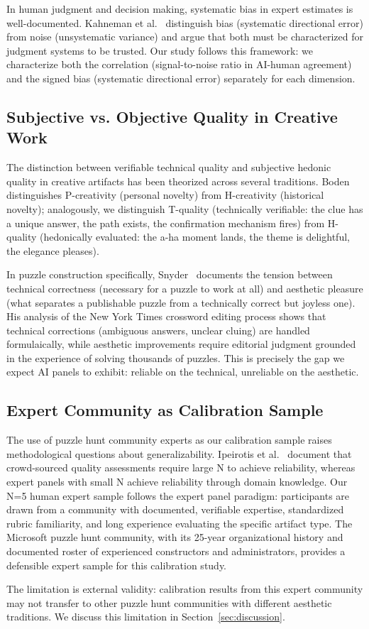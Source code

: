 In human judgment and decision making, systematic bias in expert estimates is well-documented. Kahneman et al.~\cite{kahneman2021noise} distinguish bias (systematic directional error) from noise (unsystematic variance) and argue that both must be characterized for judgment systems to be trusted. Our study follows this framework: we characterize both the correlation (signal-to-noise ratio in AI-human agreement) and the signed bias (systematic directional error) separately for each dimension.

\subsection{Subjective vs. Objective Quality in Creative Work}

The distinction between verifiable technical quality and subjective hedonic quality in creative artifacts has been theorized across several traditions. Boden~\cite{boden2004creative} distinguishes P-creativity (personal novelty) from H-creativity (historical novelty); analogously, we distinguish T-quality (technically verifiable: the clue has a unique answer, the path exists, the confirmation mechanism fires) from H-quality (hedonically evaluated: the a-ha moment lands, the theme is delightful, the elegance pleases).

In puzzle construction specifically, Snyder~\cite{snyder2007will} documents the tension between technical correctness (necessary for a puzzle to work at all) and aesthetic pleasure (what separates a publishable puzzle from a technically correct but joyless one). His analysis of the New York Times crossword editing process shows that technical corrections (ambiguous answers, unclear cluing) are handled formulaically, while aesthetic improvements require editorial judgment grounded in the experience of solving thousands of puzzles. This is precisely the gap we expect AI panels to exhibit: reliable on the technical, unreliable on the aesthetic.

\subsection{Expert Community as Calibration Sample}

The use of puzzle hunt community experts as our calibration sample raises methodological questions about generalizability. Ipeirotis et al.~\cite{ipeirotis2010quality} document that crowd-sourced quality assessments require large N to achieve reliability, whereas expert panels with small N achieve reliability through domain knowledge. Our N=5 human expert sample follows the expert panel paradigm: participants are drawn from a community with documented, verifiable expertise, standardized rubric familiarity, and long experience evaluating the specific artifact type. The Microsoft puzzle hunt community, with its 25-year organizational history and documented roster of experienced constructors and administrators, provides a defensible expert sample for this calibration study.

The limitation is external validity: calibration results from this expert community may not transfer to other puzzle hunt communities with different aesthetic traditions. We discuss this limitation in Section~\ref{sec:discussion}.
